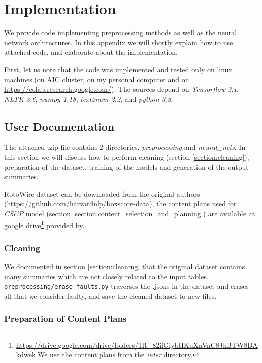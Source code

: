 \chapter{Implementation} \label{chapter:appendix_a}

We provide code implementing preprocessing methods as well as the neural network architectures. In this appendix we will shortly explain how to use attached code, and elaborate about the implementation.

First, let us note that the code was implemented and tested only on linux machines (on AIC cluster, on my personal computer and on \url{https://colab.research.google.com/}). The sources depend on \emph{Tensorflow 2.x}, \emph{NLTK 3.6}, \emph{numpy 1.18}, \emph{text2num 2.2}, and \emph{python 3.8}.

\section{User Documentation}

The attached .zip file contains 2 directories, \emph{preprocessing} and \emph{neural\_nets}. In this section we will discuss how to perform cleaning (section \ref{section:cleaning}), preparation of the dataset, training of the models and generation of the output summaries.

RotoWire dataset can be downloaded from the original authors \citep{wiseman2017} (\url{https://github.com/harvardnlp/boxscore-data}), the content plans used for \emph{CS\&P} model (section \ref{section:content_selection_and_planning}) are available at google drive\footnote{\url{https://drive.google.com/drive/folders/1R_82ifGiybHKuXnVnC8JhBTW8BAkdwek} We use the content plans from the \emph{inter} directory.} provided by\linebreak\citet{puduppully2019datatotext}.

\subsection{Cleaning}

We documented in section \ref{section:cleaning} that the original dataset contains many summaries which are not closely related to the input tables. \texttt{preprocessing/erase\_faults.py} traverses the .jsons in the dataset and erases all that we consider faulty, and save the cleaned dataset to new files.

\subsection{Preparation of Content Plans}

